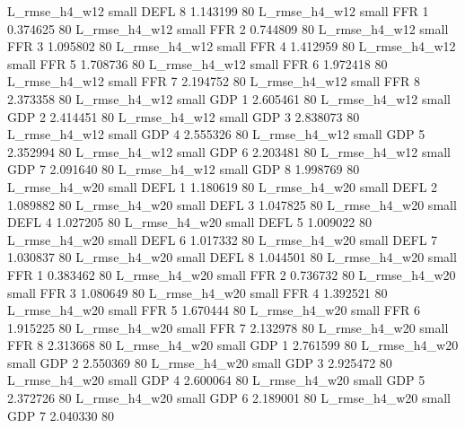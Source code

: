  L_rmse_h4_w12      small     DEFL                 8 1.143199 80
 L_rmse_h4_w12      small      FFR                 1 0.374625 80
 L_rmse_h4_w12      small      FFR                 2 0.744809 80
 L_rmse_h4_w12      small      FFR                 3 1.095802 80
 L_rmse_h4_w12      small      FFR                 4 1.412959 80
 L_rmse_h4_w12      small      FFR                 5 1.708736 80
 L_rmse_h4_w12      small      FFR                 6 1.972418 80
 L_rmse_h4_w12      small      FFR                 7 2.194752 80
 L_rmse_h4_w12      small      FFR                 8 2.373358 80
 L_rmse_h4_w12      small      GDP                 1 2.605461 80
 L_rmse_h4_w12      small      GDP                 2 2.414451 80
 L_rmse_h4_w12      small      GDP                 3 2.838073 80
 L_rmse_h4_w12      small      GDP                 4 2.555326 80
 L_rmse_h4_w12      small      GDP                 5 2.352994 80
 L_rmse_h4_w12      small      GDP                 6 2.203481 80
 L_rmse_h4_w12      small      GDP                 7 2.091640 80
 L_rmse_h4_w12      small      GDP                 8 1.998769 80
 L_rmse_h4_w20      small     DEFL                 1 1.180619 80
 L_rmse_h4_w20      small     DEFL                 2 1.089882 80
 L_rmse_h4_w20      small     DEFL                 3 1.047825 80
 L_rmse_h4_w20      small     DEFL                 4 1.027205 80
 L_rmse_h4_w20      small     DEFL                 5 1.009022 80
 L_rmse_h4_w20      small     DEFL                 6 1.017332 80
 L_rmse_h4_w20      small     DEFL                 7 1.030837 80
 L_rmse_h4_w20      small     DEFL                 8 1.044501 80
 L_rmse_h4_w20      small      FFR                 1 0.383462 80
 L_rmse_h4_w20      small      FFR                 2 0.736732 80
 L_rmse_h4_w20      small      FFR                 3 1.080649 80
 L_rmse_h4_w20      small      FFR                 4 1.392521 80
 L_rmse_h4_w20      small      FFR                 5 1.670444 80
 L_rmse_h4_w20      small      FFR                 6 1.915225 80
 L_rmse_h4_w20      small      FFR                 7 2.132978 80
 L_rmse_h4_w20      small      FFR                 8 2.313668 80
 L_rmse_h4_w20      small      GDP                 1 2.761599 80
 L_rmse_h4_w20      small      GDP                 2 2.550369 80
 L_rmse_h4_w20      small      GDP                 3 2.925472 80
 L_rmse_h4_w20      small      GDP                 4 2.600064 80
 L_rmse_h4_w20      small      GDP                 5 2.372726 80
 L_rmse_h4_w20      small      GDP                 6 2.189001 80
 L_rmse_h4_w20      small      GDP                 7 2.040330 80
